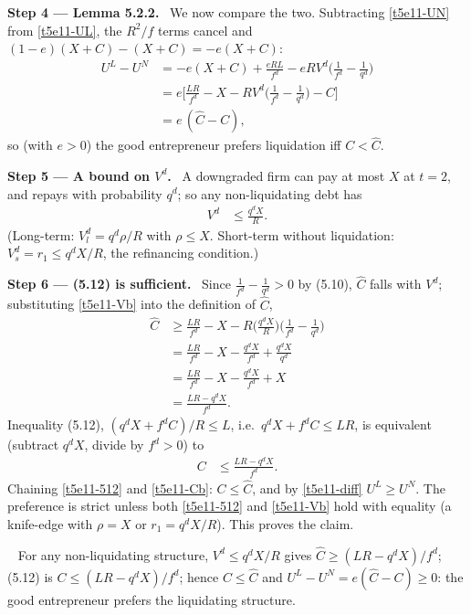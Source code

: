 \documentclass[11pt,a4paper]{article}
\newcommand{\step}[2]{\par\medskip\noindent\textbf{Step #1 --- #2.}~}
\newcommand{\answer}[1]{\par\smallskip\noindent\fbox{\textbf{Answer #1.}}~}
\begin{document}
\step{4}{Lemma 5.2.2} We now compare the two. Subtracting \eqref{t5e11-UN} from \eqref{t5e11-UL}, the
$R^2/f$ terms cancel and $(1-e)(X+C)-(X+C)=-e(X+C)$:
\begin{align}
  U^L-U^N &= -e(X+C)+\frac{eRL}{f^d}-eRV^d\Big(\frac{1}{f^d}-\frac{1}{q^d}\Big) \nonumber\\
          &= e\Big[\frac{LR}{f^d}-X-RV^d\Big(\frac{1}{f^d}-\frac{1}{q^d}\Big)-C\Big] \nonumber\\
          &= e\,(\widehat C-C), \label{t5e11-diff}
\end{align}
so (with $e>0$) the good entrepreneur prefers liquidation iff $C<\widehat C$.

\step{5}{A bound on $V^d$} A downgraded firm can pay at most $X$ at $t=2$, and repays with probability $q^d$; so any non-liquidating debt has
\begin{align}
  V^d &\le \frac{q^dX}{R}. \label{t5e11-Vb}
\end{align}
(Long-term: $V_l^d=q^d\rho/R$ with $\rho\le X$. Short-term without liquidation: $V_s^d=r_1\le q^dX/R$, the refinancing condition.)

\step{6}{(5.12) is sufficient} Since $\frac1{f^d}-\frac1{q^d}>0$ by (5.10), $\widehat C$ falls with $V^d$; substituting \eqref{t5e11-Vb} into the definition of $\widehat C$,
\begin{align}
  \widehat C &\ge \frac{LR}{f^d}-X-R\Big(\frac{q^dX}{R}\Big)\Big(\frac{1}{f^d}-\frac{1}{q^d}\Big) \nonumber\\
             &= \frac{LR}{f^d}-X-\frac{q^dX}{f^d}+\frac{q^dX}{q^d} \nonumber\\
             &= \frac{LR}{f^d}-X-\frac{q^dX}{f^d}+X \nonumber\\
             &= \frac{LR-q^dX}{f^d}. \label{t5e11-Cb}
\end{align}
Inequality (5.12), $(q^dX+f^dC)/R\le L$, i.e.\ $q^dX+f^dC\le LR$, is equivalent (subtract $q^dX$, divide by $f^d>0$) to
\begin{align}
  C &\le \frac{LR-q^dX}{f^d}. \label{t5e11-512}
\end{align}
Chaining \eqref{t5e11-512} and \eqref{t5e11-Cb}: $C\le\widehat C$, and by \eqref{t5e11-diff} $U^L\ge U^N$. The preference is strict unless both
\eqref{t5e11-512} and \eqref{t5e11-Vb} hold with equality (a knife-edge with $\rho=X$ or $r_1=q^dX/R$). This proves the claim.

\answer{(proof)} For any non-liquidating structure, $V^d\le q^dX/R$ gives $\widehat C\ge(LR-q^dX)/f^d$;
(5.12) is $C\le(LR-q^dX)/f^d$; hence $C\le\widehat C$ and $U^L-U^N=e(\widehat C-C)\ge0$: the good entrepreneur
prefers the liquidating structure.
\end{document}
